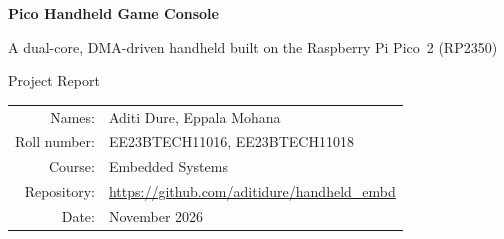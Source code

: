 \documentclass[11pt,a4paper]{article}
\newcommand{\unit}[2]{\ensuremath{#1\,\mathrm{#2}}}
\begin{document}
\begin{titlepage}
\centering
\vspace*{2cm}
{\Huge\bfseries Pico Handheld Game Console\par}
\vspace{0.6cm}
{\Large A dual-core, DMA-driven handheld built on the Raspberry Pi Pico~2 (RP2350)\par}
\vspace{1.5cm}
{\large Project Report\par}
\vspace{2cm}
\begin{tabular}{rl}
Names: & Aditi Dure, Eppala Mohana \\
Roll number: & EE23BTECH11016, EE23BTECH11018 \\
Course: & Embedded Systems \\
Repository: & \url{https://github.com/aditidure/handheld_embd} \\
Date: & November 2026 \\
\end{tabular}
\vfill

\end{titlepage}

\begin{abstract}
This report describes the design and implementation of a USB-powered handheld
game console based on the Raspberry Pi Pico~2 (RP2350 microcontroller). The
console drives a $320\times240$ ST7789 colour display over SPI, reads an analog
joystick and five push buttons, and produces sound through a PWM signal, a PAM
class-D amplifier and a speaker. It boots into a game-select menu with two
games, \emph{Space Shooter} (physics-based) and \emph{Snake}.

All graphics are drawn into a RAM framebuffer and sent to the display by DMA.
The two CPU cores form a pipeline: core~0 runs the game and draws the next frame
into one buffer while core~1 sends the previous frame from a second buffer. The
display then runs at \unit{51.4}{FPS} (frames per second), a limit set by the
SPI link, while core~0 needs only \unit{3.0}{ms} of each \unit{19.5}{ms} frame.
Buttons are sampled by a \unit{1}{kHz} timer interrupt with a \unit{5}{ms}
debounce filter and press latching, so presses are neither missed nor doubled.
Best scores are stored in on-board flash with wear levelling and CRC32 checks.
The console also has non-blocking sound effects, a pause screen, and a sleep mode
that turns the display off, lowers the CPU clock from 150 to \unit{48}{MHz} and
waits for a button press.
\end{abstract}
\end{document}
